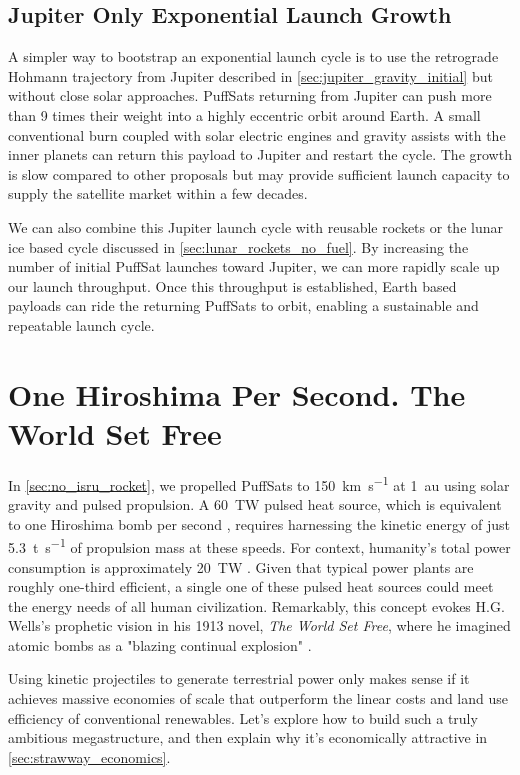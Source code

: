 \documentclass{article}
\begin{document}
{\subsection{Jupiter Only Exponential Launch Growth}\label{sec:jupiter_only_growth}
A simpler way to bootstrap an exponential launch cycle is to use the retrograde Hohmann trajectory from Jupiter described in \autoref{sec:jupiter_gravity_initial} but without close solar approaches.   PuffSats returning from Jupiter can push more than 9 times their weight into a highly eccentric orbit around Earth.   A small conventional burn coupled with solar electric engines and gravity assists with the inner planets can return this payload to Jupiter and restart the cycle.     The growth is slow compared to other proposals but may provide sufficient launch capacity to supply the satellite market within a few decades.

We can also combine this Jupiter launch cycle with reusable rockets or the lunar ice based cycle discussed in \autoref{sec:lunar_rockets_no_fuel}.  By increasing the number of initial PuffSat launches toward Jupiter, we can more rapidly scale up our launch throughput. Once this throughput is established, Earth based payloads can ride the returning PuffSats to orbit, enabling a sustainable and repeatable launch cycle.

\section{One Hiroshima Per Second. The World Set Free}\label{sec:world_set_free}
In \autoref{sec:no_isru_rocket}, we propelled PuffSats to \SI{150}{\kilo\meter\per\second} at \SI{1}{\astronomicalunit} using solar gravity and pulsed propulsion. A \SI{60}{\tera\watt} pulsed heat source, which is equivalent to one Hiroshima bomb per second \cite{hiroshima}, requires harnessing the kinetic energy of just \SI{5.3}{\tonne\per\second} of propulsion mass at these speeds. For context, humanity's total power consumption is approximately \SI{20}{\tera\watt} \cite{owid-energy-production-consumption}. Given that typical power plants are roughly one-third efficient, a single one of these pulsed heat sources could meet the energy needs of all human civilization.  Remarkably, this concept evokes H.G. Wells's prophetic vision in his 1913 novel, \textit{The World Set Free}, where he imagined atomic bombs as a "blazing continual explosion" \cite{wells1914world}.  

Using kinetic projectiles to generate terrestrial power only makes sense if it achieves massive economies of scale that outperform the linear costs and land use efficiency of conventional renewables.  Let's explore how to build such a truly ambitious megastructure, and then explain why it's economically attractive in \autoref{sec:strawway_economics}.     

}
\end{document}

